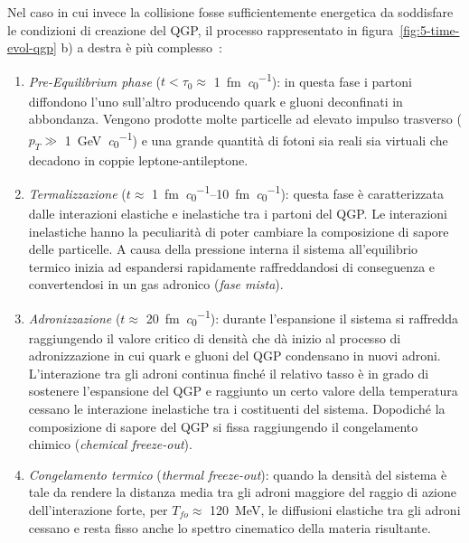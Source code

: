     Nel caso in cui invece la collisione fosse sufficientemente energetica da soddisfare le condizioni di creazione del QGP, il processo rappresentato in figura~\ref{fig:5-time-evol-qgp} b) a destra è più complesso~\cite{Strazzi_2019}:
    \begin{enumerate}
        \item \textit{Pre-Equilibrium phase} ($t < \tau_0 \approx$ \qty[per-mode = symbol]{1}{\femto \meter \per \clight}): in questa fase i partoni diffondono l'uno sull'altro producendo quark e gluoni deconfinati in abbondanza. Vengono prodotte molte particelle ad elevato impulso trasverso ($p_T \gg$ \qty[per-mode = symbol]{1}{\giga \eV \per \clight}) e una grande quantità di fotoni sia reali sia virtuali che decadono in coppie leptone-antileptone.

        \item \textit{Termalizzazione} ($t \approx$ \qtyrange[range-phrase = --, range-units = single, per-mode = symbol]{1}{10}{\femto \meter \per \clight}): questa fase è caratterizzata dalle interazioni elastiche e inelastiche tra i partoni del QGP. Le interazioni inelastiche hanno la peculiarità di poter cambiare la composizione di sapore delle particelle. A causa della pressione interna il sistema all'equilibrio termico inizia ad espandersi rapidamente raffreddandosi di conseguenza e convertendosi in un gas adronico (\textit{fase mista}).

        \item \textit{Adronizzazione} ($t \approx$ \qty[per-mode = symbol]{20}{\femto \meter \per \clight}): durante l'espansione il sistema si raffredda raggiungendo il valore critico di densità che dà inizio al processo di adronizzazione in cui quark e gluoni del QGP condensano in nuovi adroni. L'interazione tra gli adroni continua finché il relativo tasso è in grado di sostenere l'espansione del QGP e raggiunto un certo valore della temperatura cessano le interazione inelastiche tra i costituenti del sistema. Dopodiché la composizione di sapore del QGP si fissa raggiungendo il congelamento chimico (\textit{chemical freeze-out}).

        \item \textit{Congelamento termico} (\textit{thermal freeze-out}): quando la densità del sistema è tale da rendere la distanza media tra gli adroni maggiore del raggio di azione dell'interazione forte, per $T_{fo} \approx$ \qty{120}{\mega \eV}, le diffusioni elastiche tra gli adroni cessano e resta fisso anche lo spettro cinematico della materia risultante.
    \end{enumerate}

